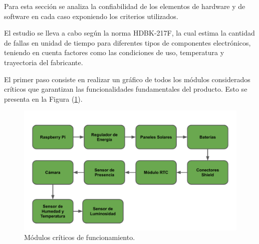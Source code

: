 %

%

Para esta sección se analiza la confiabilidad de los elementos de hardware y de software en cada caso exponiendo los criterios utilizados.

El estudio se lleva a cabo según la norma HDBK-217F, la cual estima la cantidad de fallas en unidad de tiempo para diferentes tipos de componentes electrónicos, teniendo en cuenta factores como las condiciones de uso, temperatura y trayectoria del fabricante.

El primer paso consiste en realizar un gráfico de todos los módulos considerados críticos que garantizan las funcionalidades fundamentales del producto. Esto se presenta en la Figura (\ref{fig:criticos}).

\begin{figure}[H]
	\centering
	\includegraphics[width=0.9\linewidth,page=1]{ImagenesEstudios/ModulosCriticos}		
	\caption{Módulos críticos de funcionamiento.}
	\label{fig:criticos}
\end{figure}

%
